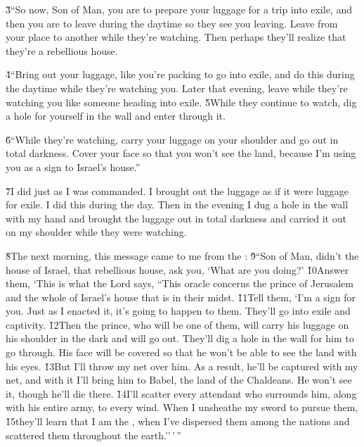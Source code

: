 \v{3}``So now, Son of Man, you are to prepare your luggage for a trip into exile, and then you are to leave during the daytime so they see you leaving. Leave from your place to another while they're watching. Then perhaps they'll realize that they're a rebellious house.

\v{4}``Bring out your luggage, like you're packing to go into exile, and do this during the daytime while they're watching you. Later that evening, leave while they're watching you like someone heading into exile. \v{5}While they continue to watch, dig a hole for yourself in the wall and enter through it.

\v{6}``While they're watching, carry your luggage on your shoulder and go out in total darkness. Cover your face so that you won't see the land, because I'm using you as a sign to Israel's house.''

\v{7}I did just as I was commanded. I brought out the luggage as if it were luggage for exile. I did this during the day. Then in the evening I dug a hole in the wall with my hand and brought the luggage out in total darkness and carried it out on my shoulder while they were watching.

\v{8}The next morning, this message came to me from the : \v{9}``Son of Man, didn't the house of Israel, that rebellious house, ask you, `What are you doing?' \v{10}Answer them, `This is what the Lord  says, ``This oracle concerns the prince of Jerusalem and the whole of Israel's house that is in their midst. \v{11}Tell them, `I'm a sign for you. Just as I enacted it, it's going to happen to them. They'll go into exile and captivity. \v{12}Then the prince, who will be one of them, will carry his luggage on his shoulder in the dark and will go out. They'll dig a hole in the wall for him to go through. His face will be covered so that he won't be able to see the land with his eyes. \v{13}But I'll throw my net over him. As a result, he'll be captured with my net, and with it I'll bring him to Babel, the land of the Chaldeans. He won't see it, though he'll die there. \v{14}I'll scatter every attendant who surrounds him, along with his entire army, to every wind. When I unsheathe my sword to pursue them, \v{15}they'll learn that I am the , when I've dispersed them among the nations and scattered them throughout the earth.''\,'\,''

